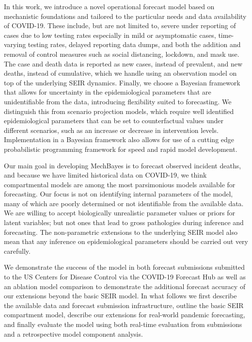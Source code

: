 \documentclass[11pt]{amsart}
\begin{document}
In this work, we introduce a novel operational forecast model based on mechanistic foundations and tailored to the particular needs and data availability of COVID-19. These include, but are not limited to, severe under reporting of cases due to low testing rates especially in mild or asymptomatic cases, time-varying testing rates, delayed reporting data dumps, and both the addition and removal of control measures such as social distancing, lockdown, and mask use. The case and death data is reported as new cases, instead of prevalent, and new deaths, instead of cumulative, which we handle using an observation model on top of the underlying SEIR dynamics. Finally, we choose a Bayesian framework that allows for uncertainty in the epidemiological parameters that are unidentifiable from the data, introducing flexibility suited to forecasting. We distinguish this from scenario projection models, which require well identified epidemiological parameters that can be set to counterfactual values under different scenarios, such as an increase or decrease in intervention levels. Implementation in a Bayesian framework also allows for use of a cutting edge probabilistic programming framework for speed and rapid model development. 

Our main goal in developing MechBayes is to forecast observed incident deaths, and because we have limited historical data on COVID-19, we think compartmental models are among the most parsimonious models available for forecasting. Our focus is not on identifying internal parameters of the model, many of which are poorly determined or not identifiable from the available data. We are willing to accept biologically unrealistic parameter values or priors for latent variables; but not ones that lead to gross pathologies during inference and forecasting. The non-parametric extensions to the underlying SEIR model also mean that any inference on epidemiological parameters should be carried out very carefully. 

 We demonstrate the success of the model in both forecast submissions submitted to the US Centers for Disease Control via the COVID-19 Forecast Hub as well as an ablation model comparison to demonstrate the additional forecast accuracy of our extensions beyond the basic SEIR model. In what follows we first describe the available data and forecast submission infrastructure, outline the basic SEIR compartment model, describe our extensions for real-world pandemic forecasting, and finally evaluate the model using both real-time evaluation from submissions and a retrospective model component analysis. 
\end{document}
